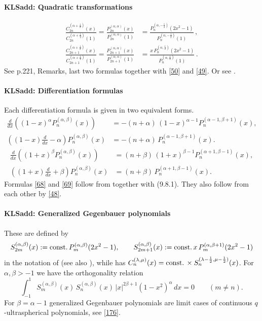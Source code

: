 \documentclass[envcountchap,graybox]{svmono}
\newcounter{rom}
\newcommand\al\alpha
\newcommand\be\beta
\newcommand\la\lambda
\newcommand\half{\frac12}
\newcommand\const{{\rm const.}\,}
\begin{document}
\paragraph{\large\bf KLSadd: Quadratic transformations}\begin{align}
\frac{C_{2n}^{(\al+\half)}(x)}{C_{2n}^{(\al+\half)}(1)}
=\frac{P_{2n}^{(\al,\al)}(x)}{P_{2n}^{(\al,\al)}(1)}
&=\frac{P_n^{(\al,-\half)}(2x^2-1)}{P_n^{(\al,-\half)}(1)}\,,
\label{51}\\
\frac{C_{2n+1}^{(\al+\half)}(x)}{C_{2n+1}^{(\al+\half)}(1)}
=\frac{P_{2n+1}^{(\al,\al)}(x)}{P_{2n+1}^{(\al,\al)}(1)}
&=\frac{x\,P_n^{(\al,\half)}(2x^2-1)}{P_n^{(\al,\half)}(1)}\,.
\label{52}
\end{align}
See p.221, Remarks, last two formulas together with \eqref{50} and \eqref{49}.
Or see .
%
\paragraph{\large\bf KLSadd: Differentiation formulas}Each differentiation formula is given in two equivalent forms.
\begin{equation}
\begin{split}
\frac d{dx}\left((1-x)^\al P_n^{(\al,\be)}(x)\right)&=
-(n+\al)\,(1-x)^{\al-1} P_n^{(\al-1,\be+1)}(x),\\
\left((1-x)\frac d{dx}-\al\right)P_n^{(\al,\be)}(x)&=
-(n+\al)\,P_n^{(\al-1,\be+1)}(x).
\end{split}
\label{68}
\end{equation}
%
\begin{equation}
\begin{split}
\frac d{dx}\left((1+x)^\be P_n^{(\al,\be)}(x)\right)&=
(n+\be)\,(1+x)^{\be-1} P_n^{(\al+1,\be-1)}(x),\\
\left((1+x)\frac d{dx}+\be\right)P_n^{(\al,\be)}(x)&=
(n+\be)\,P_n^{(\al+1,\be-1)}(x).
\end{split}
\label{69}
\end{equation}
Formulas \eqref{68} and \eqref{69} follow from
together with (9.8.1). They also follow from each other by \eqref{48}.
%
\paragraph{\large\bf KLSadd: Generalized Gegenbauer polynomials}These are defined by
\begin{equation}
S_{2m}^{(\al,\be)}(x):=\const P_m^{(\al,\be)}(2x^2-1),\qquad
S_{2m+1}^{(\al,\be)}(x):=\const x\,P_m^{(\al,\be+1)}(2x^2-1)
\label{70}
\end{equation}
in the notation of 
(see also \cite{K27}), while \cite[Section 1.5.2]{K26}
has $C_n^{(\la,\mu)}(x)=\const\allowbreak\times S_n^{(\la-\half,\mu-\half)}(x)$.
For $\al,\be>-1$ we have the orthogonality relation
\begin{equation}
\int_{-1}^1 S_m^{(\al,\be)}(x)\,S_n^{(\al,\be)}(x)\,|x|^{2\be+1}(1-x^2)^\al\,dx
=0\qquad(m\ne n).
\label{71}
\end{equation}
For $\be=\al-1$ generalized Gegenbauer polynomials are limit cases of
continuous $q$-ultraspherical polynomials, see \eqref{176}.
\end{document}
